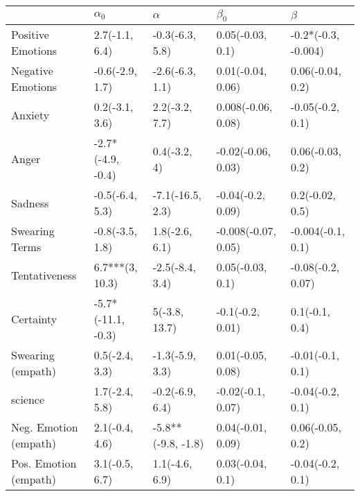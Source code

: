 \begin{tabular}{lllll}
\toprule
{} &          $\alpha_0$ &            $\alpha$ &            $\beta_0$ &              $\beta$ \\
\midrule
Positive Emotions     &      2.7(-1.1, 6.4) &     -0.3(-6.3, 5.8) &     0.05(-0.03, 0.1) &  -0.2*(-0.3, -0.004) \\
Negative Emotions     &     -0.6(-2.9, 1.7) &     -2.6(-6.3, 1.1) &    0.01(-0.04, 0.06) &     0.06(-0.04, 0.2) \\
Anxiety               &      0.2(-3.1, 3.6) &      2.2(-3.2, 7.7) &   0.008(-0.06, 0.08) &     -0.05(-0.2, 0.1) \\
Anger                 &   -2.7*(-4.9, -0.4) &        0.4(-3.2, 4) &   -0.02(-0.06, 0.03) &     0.06(-0.03, 0.2) \\
Sadness               &     -0.5(-6.4, 5.3) &    -7.1(-16.5, 2.3) &    -0.04(-0.2, 0.09) &      0.2(-0.02, 0.5) \\
Swearing Terms        &     -0.8(-3.5, 1.8) &      1.8(-2.6, 6.1) &  -0.008(-0.07, 0.05) &    -0.004(-0.1, 0.1) \\
Tentativeness         &     6.7***(3, 10.3) &     -2.5(-8.4, 3.4) &     0.05(-0.03, 0.1) &    -0.08(-0.2, 0.07) \\
Certainty             &  -5.7*(-11.1, -0.3) &       5(-3.8, 13.7) &     -0.1(-0.2, 0.01) &       0.1(-0.1, 0.4) \\
Swearing (empath)     &      0.5(-2.4, 3.3) &     -1.3(-5.9, 3.3) &    0.01(-0.05, 0.08) &     -0.01(-0.1, 0.1) \\
science               &      1.7(-2.4, 5.8) &     -0.2(-6.9, 6.4) &    -0.02(-0.1, 0.07) &     -0.04(-0.2, 0.1) \\
Neg. Emotion (empath) &      2.1(-0.4, 4.6) &  -5.8**(-9.8, -1.8) &    0.04(-0.01, 0.09) &     0.06(-0.05, 0.2) \\
Pos. Emotion (empath) &      3.1(-0.5, 6.7) &      1.1(-4.6, 6.9) &     0.03(-0.04, 0.1) &     -0.04(-0.2, 0.1) \\
\bottomrule
\end{tabular}
